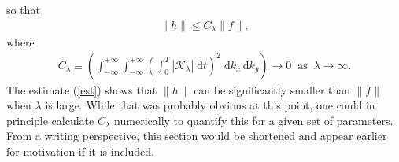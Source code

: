 \documentclass[paper=a4, fontsize=11pt]{article}
\begin{document}
so that
\begin{align}
\|h\| \leq C_\lambda \|{f}\|, \label{est}
\end{align}
where
\begin{align*}
C_\lambda \equiv \left(\int_{-\infty}^{+\infty}\int_{-\infty}^{+\infty}\left(\int_0^T |\mathcal{K}_\lambda| \;\mathrm{d}t\right)^2 \;\mathrm{d}k_x\,\mathrm{d}k_y \right)\to 0 \;\; \text{as} \;\;\lambda\to\infty.
\end{align*}
The estimate (\ref{est}) shows that $\|{h}\|$ can be significantly smaller
than $\|f\|$ when $\lambda$ is large. While that was probably obvious
at this point, one could in principle calculate $C_\lambda $ numerically
to quantify this for a given set of parameters. From a writing perspective,
this section would be shortened and appear earlier for motivation if it is included.
\end{document}
